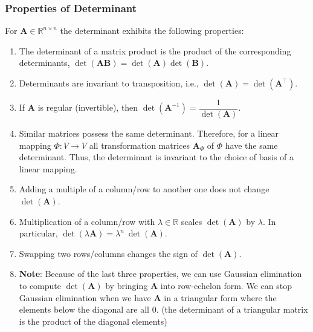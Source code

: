 \subsubsection{Properties of Determinant}

For $\bm{A} \in \mathbb{R}^{n\times n}$ the determinant exhibits the following properties:
\hfill \cite{mfml/book/mml/Deisenroth-Faisal-Ong}

\begin{enumerate}
    \item The determinant of a matrix product is the product of the corresponding determinants, $\det(\bm{AB}) = \det(\bm{A})\det(\bm{B})$.
    \hfill \cite{mfml/book/mml/Deisenroth-Faisal-Ong}

    \item Determinants are invariant to transposition, i.e., $\det(\bm{A}) = \det(\bm{A}^\top)$.
    \hfill \cite{mfml/book/mml/Deisenroth-Faisal-Ong}

    \item If $\bm{A}$ is regular (invertible), then $\det(\bm{A} ^{-1} ) = \dfrac{1} {\det(\bm{A})}$.
    \hfill \cite{mfml/book/mml/Deisenroth-Faisal-Ong}

    \item Similar matrices possess the same determinant. 
    Therefore, for a linear mapping $\Phi : V \to V$ all transformation matrices $\bm{A}_\Phi$ of $\Phi$ have the same determinant. 
    Thus, the determinant is invariant to the choice of basis of a linear mapping.
    \hfill \cite{mfml/book/mml/Deisenroth-Faisal-Ong}

    \item Adding a multiple of a column/row to another one does not change $\det(\bm{A})$.
    \hfill \cite{mfml/book/mml/Deisenroth-Faisal-Ong}

    \item Multiplication of a column/row with $\lambda \in \mathbb{R}$ scales $\det(\bm{A})$ by $\lambda$. 
    In particular, $\det(\lambda \bm{A}) = \lambda^ n \ \det(\bm{A})$.
    \hfill \cite{mfml/book/mml/Deisenroth-Faisal-Ong}

    \item Swapping two rows/columns changes the sign of $\det(\bm{A})$.
    \hfill \cite{mfml/book/mml/Deisenroth-Faisal-Ong}

    \item[] \textbf{Note}: Because of the last three properties, we can use Gaussian elimination to compute $\det(\bm{A})$ by bringing $\bm{A}$ into row-echelon form. 
    We can stop Gaussian elimination when we have $\bm{A}$ in a triangular form where the elements below the diagonal are all $0$. 
    (the determinant of a triangular matrix is the product of the diagonal elements)
\end{enumerate}









